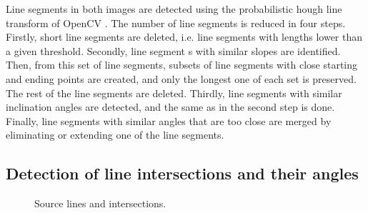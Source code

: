             Line segments in both images are detected using the probabilistic hough line transform of OpenCV \cite{opencv_library}.
            The number of line segments is reduced in four steps. 
            Firstly, short line segments are deleted, i.e. line segments with lengths lower than a given threshold.
            Secondly, line segment s with similar slopes are identified. 
            Then, from this set of line segments, subsets of line segments with close starting and ending points are created,
            and only the longest one of each set is preserved. The rest of the line segments are deleted.
            Thirdly, line segments with similar inclination angles are detected, and the same as in the second step is done.
            Finally, line segments with similar angles that are too close are merged by eliminating or extending one of the line segments.

        \subsection{Detection of line intersections and their angles}
        \label{sub:Detection of line intersections and their angles}
            \begin{figure}\centering
                \caption{Source lines and intersections.}
                \label{fig:source_intersections}
            \end{figure}


